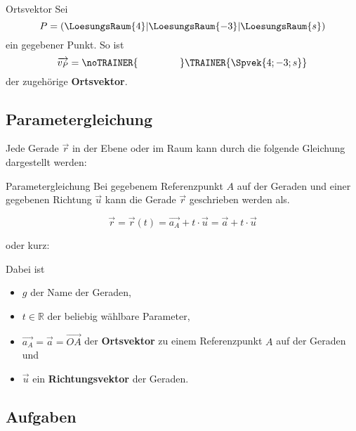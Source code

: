 \begin{beispiel}{Ortsvektor}{}
  Sei
  $$P=(\LoesungsRaum{4}|\LoesungsRaum{-3}|\LoesungsRaum{s})$$
  ein
gegebener Punkt. So ist
 $$\overrightarrow{v_P}
= \noTRAINER{\hspace{15mm}} \TRAINER{\Spvek{4;-3;s}}$$
der zugehörige \textbf{Ortsvektor}.
\end{beispiel}

\newpage
\subsection{Parametergleichung}
Jede Gerade $\vec{r}$ in der Ebene oder im Raum kann durch die
folgende Gleichung dargestellt werden:

\begin{definition}{Parametergleichung}{}
  Bei gegebenem Referenzpunkt $A$ auf der Geraden und einer gegebenen
  Richtung $\vec{u}$ kann die Gerade $\vec{r}$ geschrieben werden als.
  
  $$\vec{r} = \vec{r}(t) = \overrightarrow{a_A} + t\cdot{} \vec{u} = \vec{a} + t\cdot{}\vec{u}$$

  oder kurz:

  \begin{center}\end{center}
  
  Dabei ist
  \begin{itemize}
    \item $g$ der Name der Geraden,
    \item $t\in\mathbb{R}$ der beliebig wählbare Parameter,
    \item $\overrightarrow{a_A} = \vec{a} = \overrightarrow{OA}$ der
      \textbf{Ortsvektor} zu einem Referenzpunkt $A$ auf der Geraden und
    \item $\vec{u}$ ein
      \textbf{Richtungsvektor} der Geraden.
  \end{itemize}
  
\end{definition}

\subsection*{Aufgaben}


\newpage%
